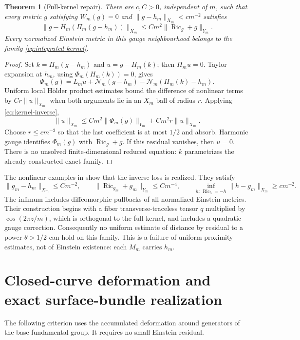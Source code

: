 \documentclass[11pt,a4paper]{article}
\newtheorem{theorem}{Theorem}[section]
\theoremstyle{definition}\newtheorem{definition}[theorem]{Definition}
\theoremstyle{remark}\newtheorem{remark}[theorem]{Remark}
\DeclareMathOperator{\Ric}{Ric}
\begin{document}
\begin{theorem}[Full-kernel repair]\label{thm:kernelrepair}
There are $c,C>0$, independent of $m$, such that every metric $g$ satisfying $W_m(g)=0$ and $\|g-h_m\|_{X_m}<cm^{-2}$ satisfies
\begin{equation}\label{eq:kernelrepair}
 \bigl\|g-H_m(\Pi_m(g-h_m))\bigr\|_{X_m}
              \le Cm^2\|\Ric_g+g\|_{Y_m}.
\end{equation}
Every normalized Einstein metric in this gauge neighbourhood belongs to the family \eqref{eq:integrated-kernel}.
\end{theorem}
\begin{proof}
Set $k=\Pi_m(g-h_m)$ and $u=g-H_m(k)$; then $\Pi_mu=0$. Taylor expansion at $h_m$, using $\Phi_m(H_m(k))=0$, gives
\[
 \Phi_m(g)=L_mu+\mathcal N_m(g-h_m)-\mathcal N_m(H_m(k)-h_m).
\]
Uniform local H\"older product estimates bound the difference of nonlinear terms by $Cr\|u\|_{X_m}$ when both arguments lie in an $X_m$ ball of radius $r$. Applying \eqref{eq:kernel-inverse},
\[
 \|u\|_{X_m}\le Cm^2\|\Phi_m(g)\|_{Y_m}
                         +Cm^2r\|u\|_{X_m}.
\]
Choose $r\le cm^{-2}$ so that the last coefficient is at most $1/2$ and absorb. Harmonic gauge identifies $\Phi_m(g)$ with $\Ric_g+g$. If this residual vanishes, then $u=0$. There is no unsolved finite-dimensional reduced equation: $k$ parametrizes the already constructed exact family.
\end{proof}

The nonlinear examples in \cite{source-kernel} show that the inverse loss is realized. They satisfy
\begin{equation}\label{eq:sharp-kernel}
 \|g_m-h_m\|_{X_m}\le Cm^{-2},\qquad
 \|\Ric_{g_m}+g_m\|_{Y_m}\le Cm^{-4},\qquad
 \inf_{h:\,\Ric_h=-h}\|h-g_m\|_{X_m}\ge cm^{-2}.
\end{equation}
The infimum includes diffeomorphic pullbacks of all normalized Einstein metrics. Their construction begins with a fiber transverse-traceless tensor $q$ multiplied by $\cos(2\pi z/m)$, which is orthogonal to the full kernel, and includes a quadratic gauge correction. Consequently no uniform estimate of distance by residual to a power $\theta>1/2$ can hold on this family. This is a failure of uniform proximity estimates, not of Einstein existence: each $M_m$ carries $h_m$.

\section{Closed-curve deformation and exact surface-bundle realization}\label{sec:cycles}
The following criterion uses the accumulated deformation around generators of the base fundamental group. It requires no small Einstein residual.
\end{document}
